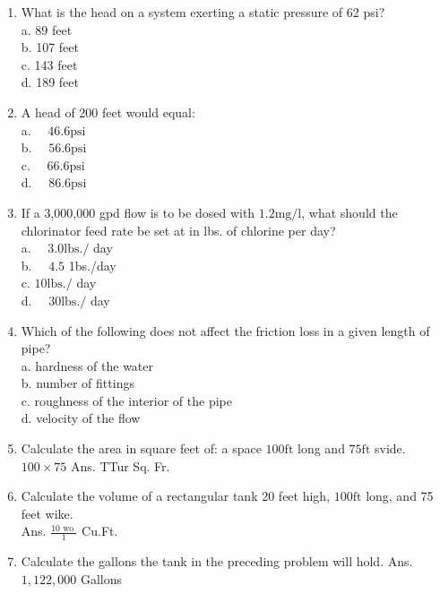 \begin{enumerate}
\item What is the head on a system exerting a static pressure of 62 psi?\\
a. 89 feet\\
b. 107 feet\\
c. 143 feet\\
d. 189 feet \\


\item A head of 200 feet would equal:\\
a. $\quad 46.6 \mathrm{psi}$\\
b. $\quad 56.6 \mathrm{psi}$\\
c. $\quad 66.6 \mathrm{psi}$\\
d. $\quad 86.6 \mathrm{psi}$\\


\item If a 3,000,000 gpd flow is to be dosed with $1.2 \mathrm{mg} / \mathrm{l}$, what should the chlorinator feed rate be set at in lbs. of chlorine per day?\\
a. $\quad 3.0 \mathrm{lbs} . /$ day\\
b. $\quad 4.5$ 1bs./day\\
c. $10 \mathrm{lbs} . /$ day\\
d. $\quad 30 \mathrm{lbs} . /$ day\\

\item Which of the following does not affect the friction loss in a given length of pipe?\\
a. hardness of the water\\
b. number of fittings\\
c. roughness of the interior of the pipe\\
d. velocity of the flow\\

\item Calculate the area in square feet of: a space $100 \mathrm{ft}$ long and $75 \mathrm{ft}$ svide. $100 \times 75$ Ans. TTur Sq. Fr.\\

\item Calculate the volume of a rectangular tank 20 feet high, $100 \mathrm{ft}$ long, and 75 feet wike.\\
Ans. $\frac{10 \text { wo }}{1}$ Cu.Ft.\\

\item Calculate the gallons the tank in the preceding problem will hold. Ans. $1,122,000$ Gallons\\


\end{enumerate}
